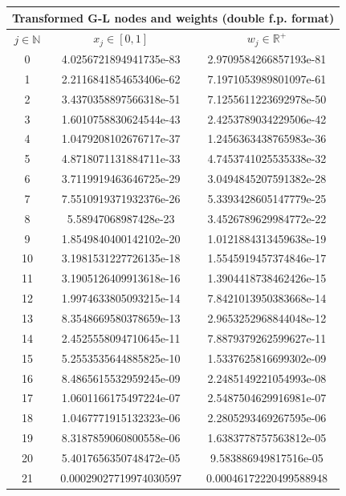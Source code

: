 \documentclass[a4paper, twosided]{book}
\begin{document}
\begin{table}[H]
\centering
\begin{tabular}{|c||c|c|}
\hline
\multicolumn{3}{|c|}{\textbf{Transformed G-L nodes and weights (double f.p. format)}} \\
\hline
$j\in\mathbb{N}$ & $x_j\in[0,1]$ & $w_j\in\mathbb{R}^+$ \\
\hline
0   &  4.0256721894941735e-83  &  2.9709584266857193e-81  \\
1   &  2.2116841854653406e-62  &  7.1971053989801097e-61  \\
2   &  3.4370358897566318e-51  &  7.1255611223692978e-50  \\
3   &  1.6010758830624544e-43  &  2.4253789034229506e-42  \\
4   &  1.0479208102676717e-37  &  1.2456363438765983e-36  \\
5   &  4.8718071131884711e-33  &  4.7453741025535338e-32  \\
6   &  3.7119919463646725e-29  &  3.0494845207591382e-28  \\
7   &  7.5510919371932376e-26  &  5.3393428605147779e-25  \\
8   &  5.58947068987428e-23    &  3.4526789629984772e-22  \\
9   &  1.8549840400142102e-20  &  1.0121884313459638e-19  \\
10  &  3.1981531227726135e-18  &  1.5545919457374846e-17  \\
11  &  3.1905126409913618e-16  &  1.3904418738462426e-15  \\
12  &  1.9974633805093215e-14  &  7.8421013950383668e-14  \\
13  &  8.3548669580378659e-13  &  2.9653252968844048e-12  \\
14  &  2.4525558094710645e-11  &  7.8879379262599627e-11  \\
15  &  5.2553535644885825e-10  &  1.5337625816699302e-09  \\
16  &  8.4865615532959245e-09  &  2.2485149221054993e-08  \\
17  &  1.0601166175497224e-07  &  2.5487504629916981e-07  \\
18  &  1.0467771915132323e-06  &  2.2805293469267595e-06  \\
19  &  8.3187859060800558e-06  &  1.6383778757563812e-05  \\
20  &  5.4017656350748472e-05  &  9.583886949817516e-05   \\
21  &  0.00029027719974030597  &  0.00046172220499588948  \\

\end{tabular}
\end{table}
\end{document}
